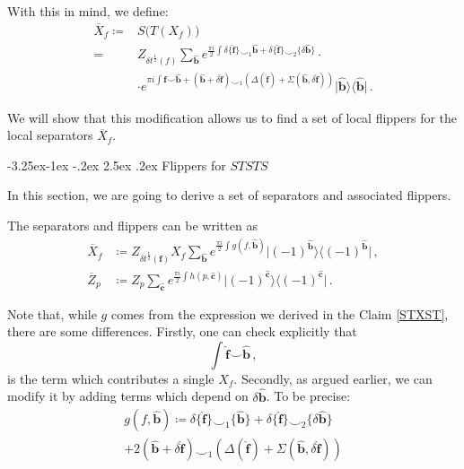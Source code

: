 \documentclass[aps,twocolumn,prx,floatfix,preprintnumbers, nofootinbib,10pt]{revtex4-2}
\makeatletter
\numberwithin{equation}{section}
\theoremstyle{definition}
\theoremstyle{remark}
\theoremstyle{claim}
\newcommand{\be}{\begin{equation}}
\newcommand{\ee}{\end{equation}}
\newcommand{\lbbb}{\left\{}
\newcommand{\rbbb}{\right\}}
\newcommand{\lrb}[1]{\lbbb #1 \rbbb}
\renewcommand\subsubsection{\@startsection{subsubsection}{3}{\z@}%
                                     {-3.25ex\@plus -1ex \@minus -.2ex}%
                                     {2.5ex \@plus .2ex}%
                                     {\centering\itshape\bfseries\small}}
\def\bra#1{{\langle{#1}|}}
\def\ket#1{{|{#1}\rangle}}
\newcommand{\paren}[1]{\left( #1 \right)}
\makeatother
\begin{document}
With this in mind, we define:
\begin{align}
\overline{X}_f \coloneqq& S \big( T (X_f) \big) \nonumber \\ 
=& Z_{\delta t^\frac{1}{2}(f)} \sum_{\bm{\hat{b}}} e^{\frac{\pi i}{2} \int \delta \{\bm{\hat{f}}\} \smile_1 \bm{\hat{b}} + \delta \{\bm{\hat{f}}\} \smile_2 \{\delta \bm{\hat{b}}\}} \cdot \nonumber \\
&\cdot e^{\pi i \int \bm{\hat{f}} \smile \bm{\hat{b}} + (\bm{\hat{b}}+ \delta \bm{\hat{f}}) \smile_1 (\Delta(\bm{\hat{f}})+\Sigma(\bm{\hat{b}},\delta \bm{\hat{f}}))} \ket{\bm{\hat{b}}} \bra{\bm{\hat{b}}} \,.
\end{align}

We will show that this modification allows us to find a set of local flippers for the local separators $\overline{X}_f$.



\subsubsection{Flippers for $STSTS$}

In this section, we are going to derive a set of separators and associated flippers.

The separators and flippers can be written as
\begin{align} \label{eq:Xbar}
\overline{X}_f &\coloneqq
Z_{\delta t^\frac{1}{2}(\bm{f})} X_f \sum_{\bm{\hat{b}}} e^{\frac{\pi i}{2} \int g(f, \bm{\hat{b}})} \ket{(-1)^{\bm{\hat{b}}}} \bra{(-1)^{\bm{\hat{b}}}} \,, \\ 
\overline{Z}_p &\coloneqq Z_p \sum_{\bm{\hat{c}}} e^{\frac{\pi i}{2} \int h(p, \bm{\hat{c}})} \ket{(-1)^{\bm{\hat{c}}}} \bra{(-1)^{\bm{\hat{c}}}} \,.
\end{align}

Note that, while $g$ comes from the expression we derived in the Claim \ref{STXST}, there are some differences. Firstly, one can check explicitly that
\be
\int \bm{\hat{f}} \smile \bm{\hat{b}} \,,
\ee
is the term which contributes a single $X_f$. Secondly, as argued earlier, we can modify it by adding terms which depend on $\delta \bm{\hat{b}}$. To be precise:
\begin{multline}
 g(f, \bm{\hat{b}}) \coloneqq \delta \{ \bm{\hat{f}} \} \smile_1 \{ \bm{\hat{b}} \} + \delta \{\bm{\hat{f}} \} \smile_2 \{ \delta \bm{\hat{b}} \} \\
 + 2 (\bm{\hat{b}} + \delta \bm{\hat{f}}) \smile_1 \paren{\Delta(\bm{\hat{f}}) + \Sigma(\bm{\hat{b}}, \delta \bm{\hat{f}})}
\end{multline}
\end{document}
